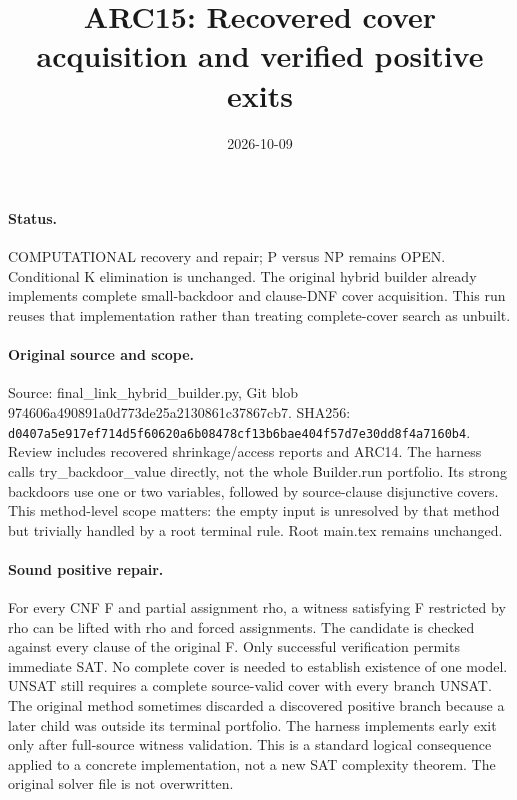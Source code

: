 \documentclass{article}
\title{ARC15: Recovered cover acquisition and verified positive exits}
\date{2026-10-09}
\begin{document}
\maketitle
\paragraph{Status.}
COMPUTATIONAL recovery and repair; P versus NP remains OPEN.
Conditional K elimination is unchanged.
The original hybrid builder already implements complete small-backdoor and
clause-DNF cover acquisition. This run reuses that implementation rather
than treating complete-cover search as unbuilt.

\paragraph{Original source and scope.}
Source: final\_link\_hybrid\_builder.py, Git blob
974606a490891a0d773de25a2130861c37867cb7.
SHA256:
\texttt{d0407a5e917ef714d5f60620a6b08478cf13b6bae404f57d7e30dd8f4a7160b4}.
Review includes recovered shrinkage/access reports and ARC14.
The harness calls try\_backdoor\_value directly, not the whole Builder.run
portfolio. Its strong backdoors use one or two variables, followed by
source-clause disjunctive covers. This method-level scope matters:
the empty input is unresolved by that method but trivially handled by a
root terminal rule. Root main.tex remains unchanged.

\paragraph{Sound positive repair.}
For every CNF F and partial assignment rho, a witness satisfying
F restricted by rho can be lifted with rho and forced assignments.
The candidate is checked against every clause of the original F.
Only successful verification permits immediate SAT.
No complete cover is needed to establish existence of one model.
UNSAT still requires a complete source-valid cover with every branch UNSAT.
The original method sometimes discarded a discovered positive branch
because a later child was outside its terminal portfolio.
The harness implements early exit only after full-source witness validation.
This is a standard logical consequence applied to a concrete implementation,
not a new SAT complexity theorem. The original solver file is not overwritten.
\end{document}
